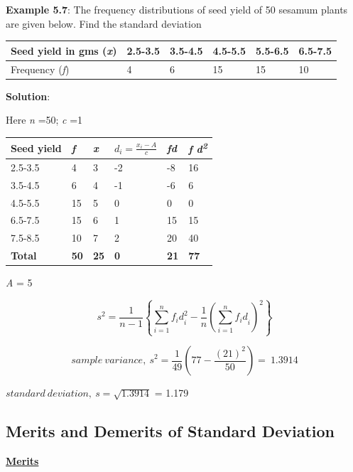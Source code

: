 \documentclass[
]{book}
\begin{document}
\textbf{Example 5.7}: The frequency distributions of seed yield of 50 sesamum
plants are given below. Find the standard deviation

\begin{longtable}[]{@{}llllll@{}}
\toprule
Seed yield in gms (\emph{x}) & 2.5-3.5 & 3.5-4.5 & 4.5-5.5 & 5.5-6.5 & 6.5-7.5 \\
\midrule
\endhead
Frequency (\emph{f}) & 4 & 6 & 15 & 15 & 10 \\
\bottomrule
\end{longtable}

\textbf{Solution}:

Here \emph{n} =50; \emph{c} =1

\begin{longtable}[]{@{}llllll@{}}
\toprule
\textbf{Seed yield} & \emph{f} & \emph{x} & \(d_{i} = \frac{x_{i} - A}{c}\) & \emph{fd} & \emph{f d\textsuperscript{2}} \\
\midrule
\endhead
2.5-3.5 & 4 & 3 & -2 & -8 & 16 \\
3.5-4.5 & 6 & 4 & -1 & -6 & 6 \\
4.5-5.5 & 15 & 5 & 0 & 0 & 0 \\
6.5-7.5 & 15 & 6 & 1 & 15 & 15 \\
7.5-8.5 & 10 & 7 & 2 & 20 & 40 \\
\textbf{Total} & \textbf{50} & \textbf{25} & \textbf{0} & \textbf{21} & \textbf{77} \\
\bottomrule
\end{longtable}

\emph{A} = 5

\[s^{2} = \frac{1}{n - 1}\left\{ \sum_{i = 1}^{n}{{f_{i}d}_{i}^{2} - \frac{1}{n}}\left( \sum_{i = 1}^{n}{f_{i}d}_{i} \right)^{2} \right\}\]

\[{sample\ variance,\ s}^{2} = \frac{1}{49}\left( 77 - \frac{\left( 21 \right)^{2}}{50} \right) = \ 1.3914\]

\(standard\ deviation,\ s = \sqrt{1.3914}\) = 1.179

\hypertarget{merits-and-demerits-of-standard-deviation}{%
\subsection{Merits and Demerits of Standard Deviation}\label{merits-and-demerits-of-standard-deviation}}

\textbf{\underline{Merits}}
\end{document}
